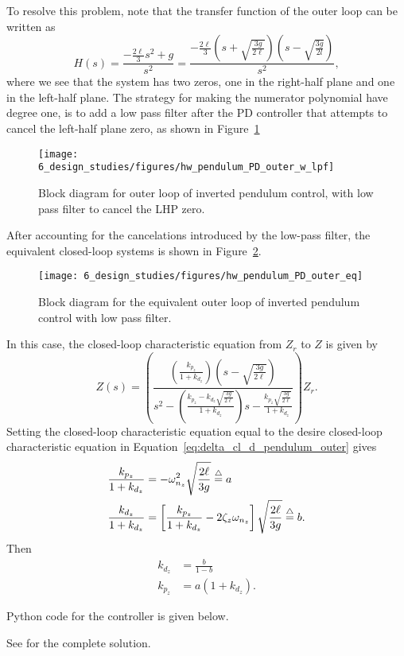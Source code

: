 To resolve this problem, note that the transfer function of the outer loop can be written as
\[
H(s) = \frac{-\frac{2\ell}{3}s^2 + g}{s^2}
     = \frac{-\frac{2\ell}{3}(s + \sqrt{\frac{3g}{2\ell}})(s-\sqrt{\frac{3g}{2l}})}{s^2},
\]
where we see that the system has two zeros, one in the right-half plane and one in the left-half plane.  The strategy for making the numerator polynomial have degree one, is to add a low pass filter after the PD controller that attempts to cancel the left-half plane zero, as shown in Figure~\ref{fig:hw_pendulum_PD_outer_w_lpf}
%
\begin{figure}[htbp]
   	\centering
   	\texttt{[image: 6\_design\_studies/figures/hw\_pendulum\_PD\_outer\_w\_lpf]} 
   	\caption{Block diagram for outer loop of inverted pendulum control, with low pass filter to cancel the LHP zero.}
   	\label{fig:hw_pendulum_PD_outer_w_lpf}
\end{figure}
%
After accounting for the cancelations introduced by the low-pass filter, the equivalent closed-loop systems is shown in Figure~\ref{fig:hw_pendulum_PD_outer_eq}.
\begin{figure}[htbp]
   	\centering
   	\texttt{[image: 6\_design\_studies/figures/hw\_pendulum\_PD\_outer\_eq]} 
   	\caption{Block diagram for the equivalent outer loop of inverted pendulum control with low pass filter.}
   	\label{fig:hw_pendulum_PD_outer_eq}
\end{figure}
%
In this case, the closed-loop characteristic equation from $Z_r$ to $Z$ is given by
\[
Z(s) = \left( 
		\frac{\left(\frac{k_{p_z}}{1+k_{d_z}}\right) (s-\sqrt{\frac{3g}{2\ell}})}
		     {s^2 - \left(\frac{k_{p_z} - k_{d_z}\sqrt{\frac{3g}{2\ell}}}{1+k_{d_z}}\right)s - \frac{k_{p_z}\sqrt{\frac{3g}{2\ell}}}{1+k_{d_z}}} 
       \right) Z_r.
\]
Setting the closed-loop characteristic equation equal to the desire closed-loop characteristic equation in Equation~\eqref{eq:delta_cl_d_pendulum_outer} gives
\begin{align}
\frac{k_{p_z}}{1+k_{d_z}} &= -\omega_{n_z}^2\sqrt{\frac{2\ell}{3g}} \stackrel{\triangle}{=} a \\
\frac{k_{d_z}}{1+k_{d_z}} &= \left[\frac{k_{p_z}}{1+k_{d_z}} - 2\zeta_z \omega_{n_z} \right] \sqrt{\frac{2\ell}{3g}} \stackrel{\triangle}{=} b. 
\end{align}
Then 
\begin{align*}
k_{d_z} &= \frac{b}{1-b} \\
k_{p_z} &= a(1+k_{d_z}).
\end{align*}


Python code for the controller is given below.




See  for the complete solution.
